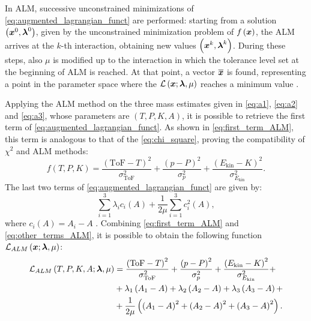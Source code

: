 In ALM, successive unconstrained minimizations of \autoref{eq:augmented_lagrangian_funct} are performed: starting from a solution $\left(\boldsymbol{x}^0,\boldsymbol{\lambda}^0\right)$, given by the unconstrained minimization problem of $f\left(\boldsymbol{x}\right)$, the ALM arrives at the $k$-th interaction, obtaining new values $\left(\boldsymbol{x}^k,\boldsymbol{\lambda}^k\right)$. During these steps, also $\mu$ is modified up to the interaction in which the tolerance level set at the beginning of ALM is reached. At that point, a vector $\overline{\boldsymbol{x}}$ is found, representing a point in the parameter space where the $\mathcal{L}\left(\boldsymbol{x};\boldsymbol{\lambda},\mu\right)$ reaches a minimum value \cite{Cho_2016}.

Applying the ALM method on the three mass estimates given in \autoref{eq:a1}, \autoref{eq:a2} and \autoref{eq:a3}, whose parameters are $\left(T,P,K,A\right)$, it is possible to retrieve the first term of \autoref{eq:augmented_lagrangian_funct}. As shown in \autoref{eq:first_term_ALM}, this term is analogous to that of the \autoref{eq:chi_square}, proving the compatibility of $\chi^2$ and ALM methods:
\begin{equation}
	f\left(T,P,K\right)=\frac{\left(\text{ToF}-T\right)^2}{\sigma^2_{\text{ToF}}}+\frac{\left(p-P\right)^2}{\sigma^2_{p}}+\frac{\left(E_\text{kin}-K\right)^2}{\sigma^2_{E_\text{kin}}}.
	\label{eq:first_term_ALM}
\end{equation}
The last two terms of \autoref{eq:augmented_lagrangian_funct} are given by:
\begin{equation}
	\sum_{i=1}^{3}\lambda_ic_i\left(A\right)+\frac{1}{2\mu}\sum_{i=1}^{3}c_i^2\left(A\right),
	\label{eq:other_terms_ALM}
\end{equation}
where $c_i\left(A\right)=A_i-A$ \cite{valle2019design}. Combining \autoref{eq:first_term_ALM} and \autoref{eq:other_terms_ALM}, it is possible to obtain the following function $\mathcal{L}_{ALM}\left(\boldsymbol{x};\boldsymbol{\lambda},\mu\right)$:
\begin{equation}
	\begin{aligned} 
		\mathcal{L}_{ALM}\left(T,P,K,A;\boldsymbol{\lambda},\mu\right)&=\frac{\left(\text{ToF}-T\right)^2}{\sigma^2_{\text{ToF}}}+\frac{\left(p-P\right)^2}{\sigma^2_{p}}+\frac{\left(E_\text{kin}-K\right)^2}{\sigma^2_{E_\text{kin}}}+\\ 
		&+\lambda_1\left(A_1-A\right)+\lambda_2\left(A_2-A\right)+\lambda_3\left(A_3-A\right)+\\ 
		&+\frac{1}{2\mu}\left(\left(A_1-A\right)^2+\left(A_2-A\right)^2+\left(A_3-A\right)^2\right).
	\end{aligned}
	\label{eq:alm_analysis}
\end{equation}
\flushbottom %